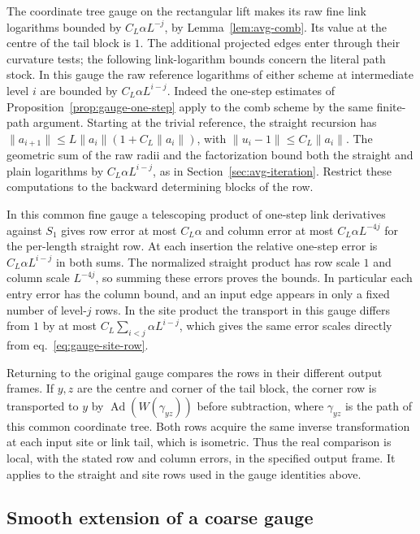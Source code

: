 \documentclass[11pt,letterpaper,reqno]{amsart}
\numberwithin{equation}{section}
\renewcommand{\eqref}[1]{\textup{eq.~\ref{#1}}}
\theoremstyle{definition}
\theoremstyle{remark}
\begin{document}
The coordinate tree gauge on the rectangular lift makes its raw
fine link logarithms bounded by \(C_L\alpha L^{-j}\), by
Lemma~\ref{lem:avg-comb}. Its value at the centre of the tail block
is \(1\). The additional projected edges enter through their
curvature tests; the following link-logarithm bounds concern the
literal path stock. In this gauge the raw reference logarithms of
either scheme at intermediate level \(i\) are bounded by
\(C_L\alpha L^{i-j}\). Indeed the one-step estimates of
Proposition~\ref{prop:gauge-one-step} apply to the comb scheme
by the same finite-path argument. Starting at the trivial reference,
the straight recursion has \(\|a_{i+1}\|\le
L\|a_i\|(1+C_L\|a_i\|)\), with
\(\|u_i-1\|\le C_L\|a_i\|\). The geometric sum of the raw
radii and the factorization bound both the straight and plain
logarithms by \(C_L\alpha L^{i-j}\), as in
Section~\ref{sec:avg-iteration}. Restrict these computations to
the backward determining blocks of the row.

In this common fine gauge a telescoping product of one-step link
derivatives against \(S_1\) gives row error at most \(C_L\alpha\)
and column error at most \(C_L\alpha L^{-4j}\) for the
per-length straight row. At each insertion the relative one-step
error is \(C_L\alpha L^{i-j}\) in both sums. The normalized
straight product has row scale \(1\) and column scale \(L^{-4j}\),
so summing these errors proves the bounds. In particular each entry
error has the column bound, and an input edge appears in only a
fixed number of level-\(j\) rows. In the site product the
transport in this gauge differs from \(1\) by at most
\(C_L\sum_{i<j}\alpha L^{i-j}\), which gives the same error scales
directly from \eqref{eq:gauge-site-row}.

Returning to the original gauge compares the rows in their
different output frames. If \(y,z\) are the centre and corner of
the tail block, the corner row is transported to \(y\) by
\(\operatorname{Ad}(W(\gamma_{yz}))\) before subtraction,
where \(\gamma_{yz}\) is the path of this common coordinate tree.
Both rows acquire the same inverse transformation at each input
site or link tail, which is isometric. Thus the real comparison is
local, with the stated row and column errors, in the specified
output frame. It applies to the straight and site rows used in
the gauge identities above.

\subsection{Smooth extension of a coarse gauge}\label{sec:smooth-node-gauge}
\end{document}
